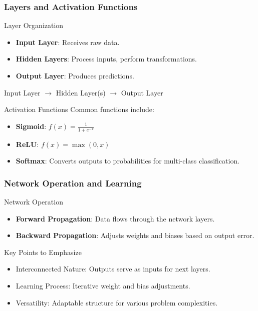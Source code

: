 \documentclass{beamer}
\begin{document}
\begin{frame}[fragile]
    \frametitle{Layers and Activation Functions}
    \begin{block}{Layer Organization}
        \begin{itemize}
            \item \textbf{Input Layer}: Receives raw data.
            \item \textbf{Hidden Layers}: Process inputs, perform transformations.
            \item \textbf{Output Layer}: Produces predictions.
        \end{itemize}
        \begin{center}
            Input Layer $\rightarrow$ Hidden Layer(s) $\rightarrow$ Output Layer
        \end{center}
    \end{block}
    
    \begin{block}{Activation Functions}
        Common functions include:
        \begin{itemize}
            \item \textbf{Sigmoid}: \(f(x) = \frac{1}{1 + e^{-x}}\)
            \item \textbf{ReLU}: \(f(x) = \max(0, x)\)
            \item \textbf{Softmax}: Converts outputs to probabilities for multi-class classification.
        \end{itemize}
    \end{block}
\end{frame}

\begin{frame}[fragile]
    \frametitle{Network Operation and Learning}
    \begin{block}{Network Operation}
        \begin{itemize}
            \item \textbf{Forward Propagation}: Data flows through the network layers.
            \item \textbf{Backward Propagation}: Adjusts weights and biases based on output error.
        \end{itemize}
    \end{block}
    
    \begin{block}{Key Points to Emphasize}
        \begin{itemize}
            \item Interconnected Nature: Outputs serve as inputs for next layers.
            \item Learning Process: Iterative weight and bias adjustments.
            \item Versatility: Adaptable structure for various problem complexities.
        \end{itemize}
    \end{block}
\end{frame}
\end{document}
